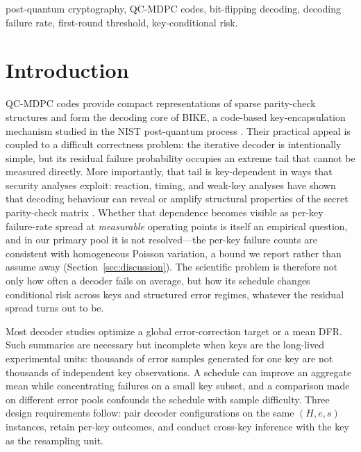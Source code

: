 \documentclass[lettersize,journal]{IEEEtran}
\begin{document}
\begin{IEEEkeywords}
post-quantum cryptography, QC-MDPC codes, bit-flipping decoding, decoding failure rate, first-round threshold, key-conditional risk.
\end{IEEEkeywords}

\section{Introduction}\label{sec:intro}

QC-MDPC codes provide compact representations of sparse parity-check structures and form the decoding core of BIKE, a code-based key-encapsulation mechanism studied in the NIST post-quantum process \cite{misoczki2013mdpc,bike2024spec,alagic2025nist}. Their practical appeal is coupled to a difficult correctness problem: the iterative decoder is intentionally simple, but its residual failure probability occupies an extreme tail that cannot be measured directly. More importantly, that tail is key-dependent in ways that security analyses exploit: reaction, timing, and weak-key analyses have shown that decoding behaviour can reveal or amplify structural properties of the secret parity-check matrix \cite{guo2016key,eaton2018timing,wang2023weak,gellersen2025}. Whether that dependence becomes visible as per-key failure-rate spread at \emph{measurable} operating points is itself an empirical question, and in our primary pool it is not resolved---the per-key failure counts are consistent with homogeneous Poisson variation, a bound we report rather than assume away (Section~\ref{sec:discussion}). The scientific problem is therefore not only how often a decoder fails on average, but how its schedule changes conditional risk across keys and structured error regimes, whatever the residual spread turns out to be.

Most decoder studies optimize a global error-correction target or a mean DFR. Such summaries are necessary but incomplete when keys are the long-lived experimental units: thousands of error samples generated for one key are not thousands of independent key observations. A schedule can improve an aggregate mean while concentrating failures on a small key subset, and a comparison made on different error pools confounds the schedule with sample difficulty. Three design requirements follow: pair decoder configurations on the same $(H,e,s)$ instances, retain per-key outcomes, and conduct cross-key inference with the key as the resampling unit.
\end{document}
